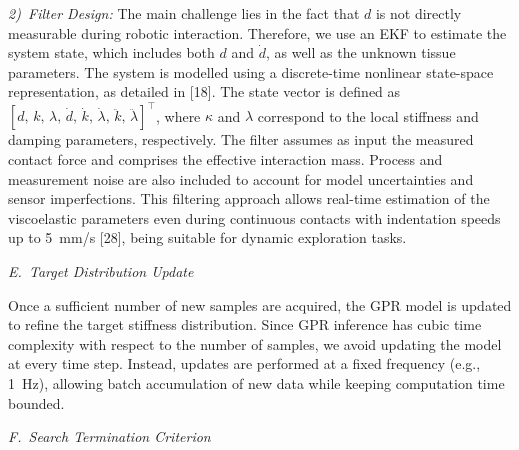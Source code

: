 \documentclass[11pt]{article}
\begin{document}
\noindent\textit{\hspace{1em}2)~Filter Design:} The main challenge
lies in the fact that $d$ is not directly measurable during robotic
interaction. Therefore, we use an EKF to estimate the system state,
which includes both $d$ and $\dot{d}$, as well as the unknown tissue
parameters. The system is modelled using a discrete-time nonlinear
state-space representation, as detailed in [18]. The state vector is
defined as $[d,\,k,\,\lambda,\,\dot{d},\,\dot{k},\,\dot{\lambda},\,
\ddot{k},\,\ddot{\lambda}]^{\top}$, where $\kappa$ and $\lambda$
correspond to the local stiffness and damping parameters,
respectively. The filter assumes as input the measured contact force
and comprises the effective interaction mass. Process and measurement
noise are also included to account for model uncertainties and sensor
imperfections. This filtering approach allows real-time estimation of
the viscoelastic parameters even during continuous contacts with
indentation speeds up to 5~mm/s [28], being suitable for dynamic
exploration tasks.

\vspace{0.6em}

\noindent\textit{E.~Target Distribution Update}

\vspace{0.2em}

\noindent
Once a sufficient number of new samples are acquired, the GPR model
is updated to refine the target stiffness distribution. Since GPR
inference has cubic time complexity with respect to the number of
samples, we avoid updating the model at every time step. Instead,
updates are performed at a fixed frequency (e.g., 1~Hz), allowing
batch accumulation of new data while keeping computation time
bounded.

\vspace{0.6em}

\noindent\textit{F.~Search Termination Criterion}

\vspace{0.2em}
\end{document}
